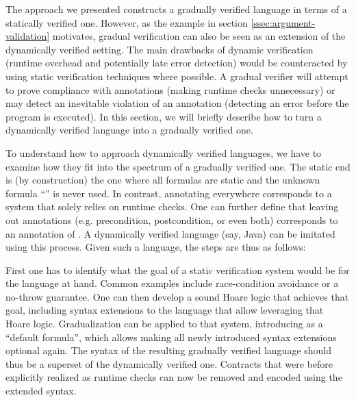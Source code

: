 The approach we presented constructs a gradually verified language in terms of a statically verified one.
However, as the example in section \ref{ssec:argument-validation} motivates, gradual verification can also be seen as an extension of the dynamically verified setting.
The main drawbacks of dynamic verification (runtime overhead and potentially late error detection) would be counteracted by using static verification techniques where possible.
A gradual verifier will attempt to prove compliance with annotations (making runtime checks unnecessary) or may detect an inevitable violation of an annotation (detecting an error before the program is executed).
In this section, we will briefly describe how to turn a dynamically verified language into a gradually verified one.

To understand how to approach dynamically verified languages, we have to examine how they fit into the spectrum of a gradually verified one.
The static end is (by construction) the one where all formulas are static and the unknown formula “\qm” is never used.
In contrast, annotating \qm everywhere corresponds to a system that solely relies on runtime checks.
One can further define that leaving out annotations (e.g. precondition, postcondition, or even both) corresponds to an annotation of \qm.
A dynamically verified language (say, Java) can be imitated using this process.
Given such a language, the steps are thus as follows:

First one has to identify what the goal of a static verification system would be for the language at hand.
Common examples include race-condition avoidance or a no-throw guarantee.
One can then develop a sound Hoare logic that achieves that goal, including syntax extensions to the language that allow leveraging that Hoare logic.
Gradualization can be applied to that system, introducing \qm as a “default formula”, which allows making all newly introduced syntax extensions optional again.
The syntax of the resulting gradually verified language should thus be a superset of the dynamically verified one.
Contracts that were before explicitly realized as runtime checks can now be removed and encoded using the extended syntax.